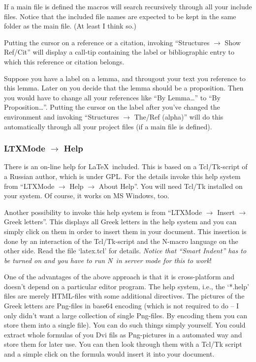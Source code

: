 \documentclass{article}
\newcommand{\nedit}{N\kern-0.8pt{Edit}}
\newcommand{\menu}[1]{``#1''}
\begin{document}
If a main file is defined  the macros will search recursively through all your include files. Notice that the included file names are expected to be kept in the same folder as the main file. (At least I think so.)

Putting the cursor on a reference or a citation, invoking \menu{Structures $\to$ Show Ref/Cit} will display a call-tip containing the label or bibliographic entry to which this reference or citation belongs.

Suppose you have a label on a lemma, and througout your text you reference to this lemma. Later on you decide that the lemma should be a proposition. Then you would have to change all your references like ``By Lemma\dots'' to ``By Proposition\dots''. Putting the cursor on the label after you've changed the environment and invoking \menu{Structures $\to$ The/Ref (alpha)} will do this automatically through all your project files (if a main file is defined).

\subsubsection{LTXMode $\to$ Help}\label{technote}
There is an on-line help for \LaTeX\ included. This is based on a Tcl/Tk-script of a Russian author, which is under GPL. For the details invoke this help system from
\menu{LTXMode $\to$ Help $\to$ About Help}. You will need Tcl/Tk installed on your system. Of course, it works on MS Windows, too.

Another possibility to invoke this help system is from
\menu{LTXMode $\to$ Insert $\to$ Greek letters}. This displays all Greek letters in the help system and you can simply click on them in order to insert them in your document.  This insertion is done by an interaction of the Tcl/Tk-script and the \nedit-macro language on the other side. Read the file `latex.tcl' for details. \emph{Notice that ``Smart Indent'' has to be turned on and you have to run \nedit\ in server mode for this to work}!

One of the advantages of the above approach is that it is cross-platform and doesn't depend on a particular editor program. The help system, i.e., the `*.help' files are merely HTML-files with some additional directives. The pictures of the Greek letters are Png-files in base64 encoding (which is not required to do -- I only didn't want a large collection of single Png-files. By encoding them you can store them into a single file).  You can do such things simply yourself. You could extract whole formulas of you Dvi fils as Png-pictures in a automated way and store them for later use. You can then look through them with a Tcl/Tk script and a simple click on the formula would insert it into your document.
\end{document}

